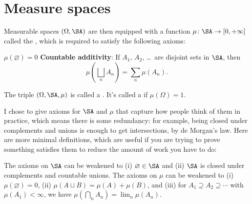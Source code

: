 \section{Measure spaces}
\begin{definition}
	Measurable spaces $(\Omega, \SA)$ are then equipped
	with a function $\mu \colon \SA \to [0, +\infty]$
	called the , which is required to satisfy
	the following axioms:
	\begin{itemize}
		\ii $\mu(\varnothing) = 0$
		\ii \textbf{Countable additivity}:
		If $A_1$, $A_2$, \dots\ are disjoint sets in $\SA$,
		then \[ \mu\left( \bigsqcup_n A_n \right) = \sum_n \mu(A_n). \]
	\end{itemize}
	The triple $(\Omega, \SA, \mu)$ is called a .
	It's called a  if $\mu(\Omega) = 1$.
\end{definition}
\begin{exercise}
	I chose to give axioms for $\SA$ and $\mu$
	that capture how people think of them in practice,
	which means there is some redundancy:
	for example, being closed under complements and unions
	is enough to get intersections, by de Morgan's law.
	Here are more minimal definitions,
	which are useful if you are trying to prove something satisfies them
	to reduce the amount of work you have to do:
	\begin{enumerate}[(a)]
		\ii The axioms on $\SA$ can be weakened
		to (i) $\varnothing \in \SA$ and (ii) $\SA$ is closed under
		complements and countable unions.
		\ii The axioms on $\mu$ can be weakened to
		(i) $\mu(\varnothing) = 0$,
		(ii) $\mu(A \sqcup B) = \mu(A) + \mu(B)$, and
		(iii) for $A_1 \supseteq A_2 \supseteq \cdots$ with $\mu(A_1) < \infty$,
		we have $\mu\left( \bigcap_n A_n \right) = \lim_n \mu(A_n)$.
	\end{enumerate}
\end{exercise}


